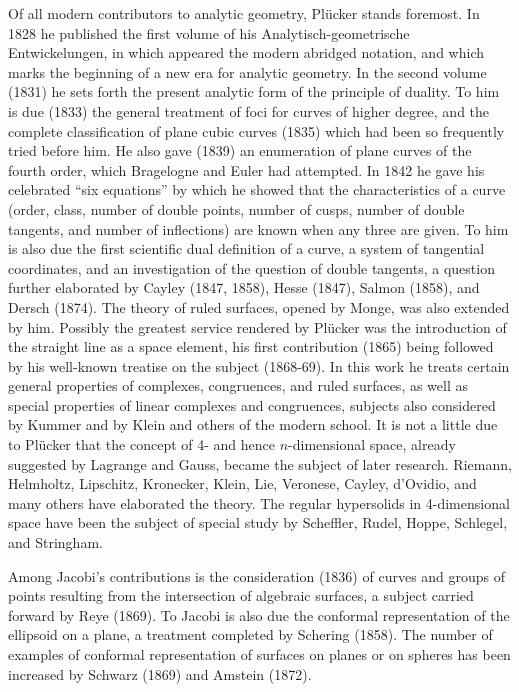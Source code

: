\documentclass[oneside]{book}
\begin{document}
{Of all modern contributors to analytic geometry, Pl\"ucker stands
foremost. In 1828 he published the first volume of his
Analytisch-geometrische Entwickelungen, in which appeared
the modern abridged notation, and which marks the beginning of a new
era for analytic geometry. In the second volume (1831) he sets forth
the present analytic form of the principle of duality. To him is due
(1833) the general treatment of foci for curves of higher degree,
and the complete classification of plane cubic curves (1835) which
had been so frequently tried before him. He also gave (1839) an
enumeration of plane curves of the fourth order, which Bragelogne
and Euler had attempted. In 1842 he gave his celebrated ``six
equations'' by which he showed that the characteristics of a curve
(order, class, number of double points, number of cusps, number of
double tangents, and number of inflections) are known when any three
are given. To him is also due the first scientific dual definition
of a curve, a system of tangential coordinates, and an
investigation of the question of double tangents, a question further
elaborated by Cayley (1847, 1858), Hesse (1847), Salmon (1858), and
Dersch (1874). The theory of ruled surfaces, opened by Monge, was
also extended by him. Possibly the greatest service rendered by
Pl\"ucker was the introduction of the straight line as a space
element, his first contribution (1865) being followed by his
well-known treatise on the subject (1868-69). In this work he treats
certain general properties of complexes, congruences, and ruled
surfaces, as well as special properties of linear complexes and
congruences, subjects also considered by Kummer and by Klein and
others of the modern school. It is not a little due to Pl\"ucker that
the concept of 4- and hence $n$-dimensional space, already suggested
by Lagrange and Gauss, became the subject of later
research. Riemann, Helmholtz, Lipschitz, Kronecker, Klein, Lie,
Veronese, Cayley, d'Ovidio, and many others have elaborated the
theory. The regular hypersolids in 4-dimensional space have been
the subject of special study by Scheffler, Rudel, Hoppe, Schlegel,
and Stringham.

Among Jacobi's contributions is the consideration (1836) of curves
and groups of points resulting from the intersection of algebraic
surfaces, a subject carried forward by Reye (1869). To Jacobi is
also due the conformal representation of the ellipsoid on a plane, a
treatment completed by Schering (1858). The number of examples of
conformal representation of surfaces on planes or on spheres has
been increased by Schwarz (1869) and Amstein (1872).

}
\end{document}
